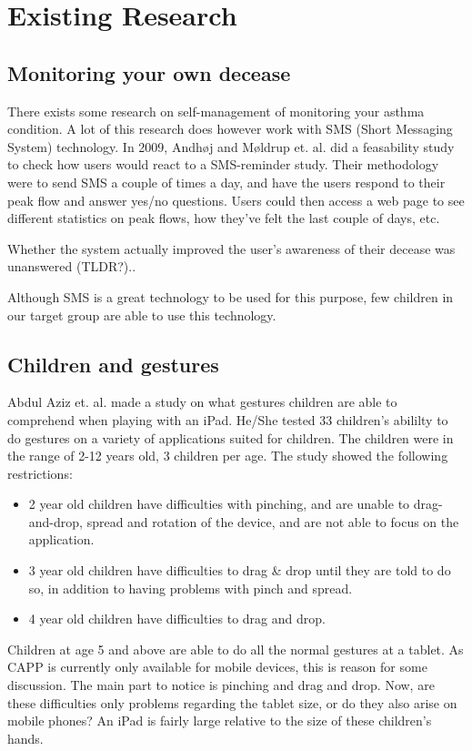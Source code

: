 \section{Existing Research}
\label{sec:existing-research}

\subsection{Monitoring your own decease}
There exists some research on self-management of monitoring your asthma condition. A lot of this research does however work with SMS (Short Messaging System) technology. In 2009, Andh\o j and M\o ldrup et. al.\cite{anhoj2004feasibility} did a feasability study to check how users would react to a SMS-reminder study. Their methodology were to send SMS a couple of times a day, and have the users respond to their peak flow and answer yes/no questions. Users could then access a web page to see different statistics on peak flows, how they've felt the last couple of days, etc.


Whether the system actually improved the user's awareness of their decease was unanswered (TLDR?).. 

Although SMS is a great technology to be used for this purpose, few children in our target group are able to use this technology. 


\subsection{Children and gestures}

Abdul Aziz et. al. \cite{aziz2013children} made a study on what gestures children are able to comprehend when playing with an iPad. He/She tested 33 children's abililty to do gestures on a variety of applications suited for children. The children were in the range of 2-12 years old, 3 children per age. The study showed the following restrictions:

\begin{itemize}
  \item 2 year old children have difficulties with pinching, and are unable to drag-and-drop, spread and rotation of the device, and are not able to focus on the application. 
  \item 3 year old children have difficulties to drag \& drop until they are told to do so, in addition to having problems with pinch and spread. 
  \item 4 year old children have difficulties to drag and drop. 
\end{itemize}
Children at age 5 and above are able to do all the normal gestures at a tablet. As CAPP is currently only available for mobile devices, this is reason for some discussion. The main part to notice is pinching and drag and drop. Now, are these difficulties only problems regarding the tablet size, or do they also arise on mobile phones? An iPad is fairly large relative to the size of these children's hands. 
